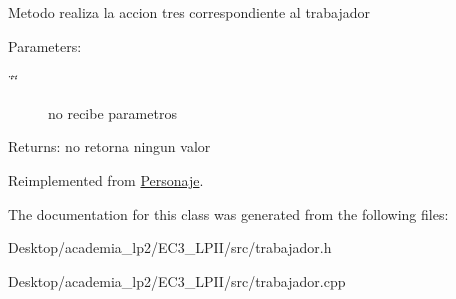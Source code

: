Metodo realiza la accion tres correspondiente al trabajador \begin{Desc}
\item[Parameters:]
\begin{description}
\item[{\em \char`\"{}\char`\"{}}]no recibe parametros \end{description}
\end{Desc}
\begin{Desc}
\item[Returns:]no retorna ningun valor \end{Desc}


Reimplemented from \hyperlink{classPersonaje_85c25ff0362bf4f4f5e69965c1ae4cfb}{Personaje}.

The documentation for this class was generated from the following files:\begin{CompactItemize}
\item 
Desktop/academia\_\-lp2/EC3\_\-LPII/src/trabajador.h\item 
Desktop/academia\_\-lp2/EC3\_\-LPII/src/trabajador.cpp\end{CompactItemize}
